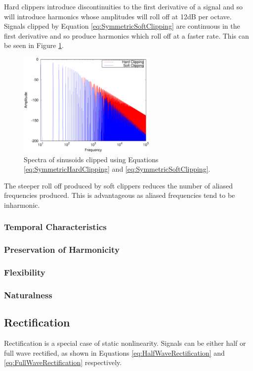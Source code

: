 			Hard clippers introduce discontinuities to the first derivative of a signal and so will introduce
			harmonics whose amplitudes will roll off at 12dB per octave. Signals clipped by Equation
			\ref{eq:SymmetricSoftClipping} are continuous in the first derivative  and so
			produce harmonics which roll off at a faster rate. This can be seen in Figure
			\ref{fig:ClippingSpectra}.

			\begin{figure}[h!]
				\centering
				\includegraphics[width=0.6\textwidth]{chapter3/Images/ClippingSpectra.eps}
				\caption{Spectra of sinusoids clipped using Equations \ref{eq:SymmetricHardClipping} and
			                 \ref{eq:SymmetricSoftClipping}.}
				\label{fig:ClippingSpectra}
			\end{figure}

			The steeper roll off produced by soft clippers reduces the number of aliased frequencies produced.
			This is advantageous as aliased frequencies tend to be inharmonic.

		\subsubsection*{Temporal Characteristics}
		\subsubsection*{Preservation of Harmonicity}
		\subsubsection*{Flexibility}
		\subsubsection*{Naturalness}

	\subsection{Rectification}
	\label{sec:Excitation-Rectification}
		Rectification is a special case of static nonlinearity. Signals can be either half or full wave rectified,
		as shown in Equations \ref{eq:HalfWaveRectification} and \ref{eq:FullWaveRectification} respectively.

